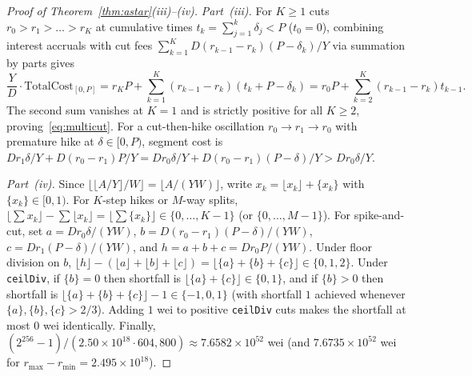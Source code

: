 \begin{proof}[Proof of Theorem~\ref{thm:astar}(iii)--(iv)]
\emph{Part~(iii).} For $K \ge 1$ cuts $r_0 > r_1 > \dots > r_K$ at cumulative times $t_k = \sum_{j=1}^k \delta_j < P$ ($t_0 = 0$), combining interest accruals with cut fees $\sum_{k=1}^K D(r_{k-1} - r_k)(P - \delta_k)/Y$ via summation by parts gives
\[
\frac{Y}{D}\cdot\mathrm{TotalCost}_{[0, P]} = r_K P + \sum_{k=1}^K (r_{k-1} - r_k)(t_k + P - \delta_k) = r_0 P + \sum_{k=2}^K (r_{k-1} - r_k)t_{k-1}.
\]
The second sum vanishes at $K = 1$ and is strictly positive for all $K \ge 2$, proving~\eqref{eq:multicut}. For a cut-then-hike oscillation $r_0 \to r_1 \to r_0$ with premature hike at $\delta \in [0, P)$, segment cost is $D r_1 \delta/Y + D(r_0 - r_1)P/Y = D r_0 \delta/Y + D(r_0 - r_1)(P - \delta)/Y > D r_0 \delta/Y$.

\emph{Part~(iv).} Since $\lfloor \lfloor A/Y \rfloor / W \rfloor = \lfloor A / (YW) \rfloor$, write $x_k = \lfloor x_k \rfloor + \{x_k\}$ with $\{x_k\} \in [0, 1)$. For $K$-step hikes or $M$-way splits, $\lfloor \sum x_k \rfloor - \sum \lfloor x_k \rfloor = \lfloor \sum \{x_k\} \rfloor \in \{0, \dots, K - 1\}$ (or $\{0, \dots, M - 1\}$). For spike-and-cut, set $a = D r_0 \delta/(YW)$, $b = D(r_0 - r_1)(P - \delta)/(YW)$, $c = D r_1(P - \delta)/(YW)$, and $h = a + b + c = D r_0 P/(YW)$. Under floor division on $b$, $\lfloor h \rfloor - (\lfloor a \rfloor + \lfloor b \rfloor + \lfloor c \rfloor) = \lfloor \{a\} + \{b\} + \{c\} \rfloor \in \{0, 1, 2\}$. Under \texttt{ceilDiv}, if $\{b\} = 0$ then shortfall is $\lfloor \{a\} + \{c\} \rfloor \in \{0, 1\}$, and if $\{b\} > 0$ then shortfall is $\lfloor \{a\} + \{b\} + \{c\} \rfloor - 1 \in \{-1, 0, 1\}$ (with shortfall $1$ achieved whenever $\{a\}, \{b\}, \{c\} > 2/3$). Adding $1$ wei to positive \texttt{ceilDiv} cuts makes the shortfall at most $0$ wei identically. Finally, $(2^{256} - 1)/(2.50 \times 10^{18} \cdot 604{,}800) \approx 7.6582 \times 10^{52}$ wei (and $7.6735 \times 10^{52}$ wei for $r_{\max} - r_{\min} = 2.495 \times 10^{18}$).
\end{proof}

